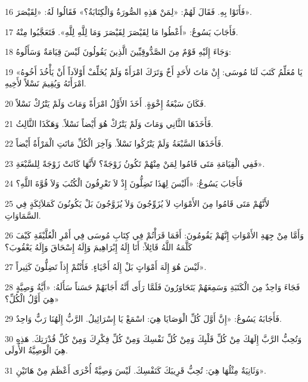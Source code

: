 \par 16 فَأَتَوْا بِهِ. فَقَالَ لَهُمْ: «لِمَنْ هَذِهِ الصُّورَةُ وَالْكِتَابَةُ؟» فَقَالُوا لَهُ: «لِقَيْصَرَ».
\par 17 فَأَجَابَ يَسُوعُ: «أَعْطُوا مَا لِقَيْصَرَ لِقَيْصَرَ وَمَا لِلَّهِ لِلَّهِ». فَتَعَجَّبُوا مِنْهُ.
\par 18 وَجَاءَ إِلَيْهِ قَوْمٌ مِنَ الصَّدُّوقِيِّينَ الَّذِينَ يَقُولُونَ لَيْسَ قِيَامَةٌ وَسَأَلُوهُ:
\par 19 «يَا مُعَلِّمُ كَتَبَ لَنَا مُوسَى: إِنْ مَاتَ لأَحَدٍ أَخٌ وَتَرَكَ امْرَأَةً وَلَمْ يُخَلِّفْ أَوْلاَداً أَنْ يَأْخُذَ أَخُوهُ امْرَأَتَهُ وَيُقِيمَ نَسْلاً لأَخِيهِ.
\par 20 فَكَانَ سَبْعَةُ إِخْوَةٍ. أَخَذَ الأَوَّلُ امْرَأَةً وَمَاتَ وَلَمْ يَتْرُكْ نَسْلاً.
\par 21 فَأَخَذَهَا الثَّانِي وَمَاتَ وَلَمْ يَتْرُكْ هُوَ أَيْضاً نَسْلاً. وَهَكَذَا الثَّالِثُ.
\par 22 فَأَخَذَهَا السَّبْعَةُ وَلَمْ يَتْرُكُوا نَسْلاً. وَآخِرَ الْكُلِّ مَاتَتِ الْمَرْأَةُ أَيْضاً.
\par 23 فَفِي الْقِيَامَةِ مَتَى قَامُوا لِمَنْ مِنْهُمْ تَكُونُ زَوْجَةً؟ لأَنَّهَا كَانَتْ زَوْجَةً لِلسَّبْعَةِ».
\par 24 فَأَجَابَ يَسُوعُ: «أَلَيْسَ لِهَذَا تَضِلُّونَ إِذْ لاَ تَعْرِفُونَ الْكُتُبَ وَلاَ قُوَّةَ اللَّهِ؟
\par 25 لأَنَّهُمْ مَتَى قَامُوا مِنَ الأَمْوَاتِ لاَ يُزَوِّجُونَ وَلاَ يُزَوَّجُونَ بَلْ يَكُونُونَ كَمَلاَئِكَةٍ فِي السَّمَاوَاتِ.
\par 26 وَأَمَّا مِنْ جِهَةِ الأَمْوَاتِ إِنَّهُمْ يَقُومُونَ: أَفَمَا قَرَأْتُمْ فِي كِتَابِ مُوسَى فِي أَمْرِ الْعُلَّيْقَةِ كَيْفَ كَلَّمَهُ اللَّهُ قَائِلاً: أَنَا إِلَهُ إِبْرَاهِيمَ وَإِلَهُ إِسْحَاقَ وَإِلَهُ يَعْقُوبَ؟
\par 27 لَيْسَ هُوَ إِلَهَ أَمْوَاتٍ بَلْ إِلَهُ أَحْيَاءٍ. فَأَنْتُمْ إِذاً تَضِلُّونَ كَثِيراً».
\par 28 فَجَاءَ وَاحِدٌ مِنَ الْكَتَبَةِ وَسَمِعَهُمْ يَتَحَاوَرُونَ فَلَمَّا رَأَى أَنَّهُ أَجَابَهُمْ حَسَناً سَأَلَهُ: «أَيَّةُ وَصِيَّةٍ هِيَ أَوَّلُ الْكُلِّ؟»
\par 29 فَأَجَابَهُ يَسُوعُ: «إِنَّ أَوَّلَ كُلِّ الْوَصَايَا هِيَ: اسْمَعْ يَا إِسْرَائِيلُ. الرَّبُّ إِلَهُنَا رَبٌّ وَاحِدٌ.
\par 30 وَتُحِبُّ الرَّبَّ إِلَهَكَ مِنْ كُلِّ قَلْبِكَ وَمِنْ كُلِّ نَفْسِكَ وَمِنْ كُلِّ فِكْرِكَ وَمِنْ كُلِّ قُدْرَتِكَ. هَذِهِ هِيَ الْوَصِيَّةُ الأُولَى.
\par 31 وَثَانِيَةٌ مِثْلُهَا هِيَ: تُحِبُّ قَرِيبَكَ كَنَفْسِكَ. لَيْسَ وَصِيَّةٌ أُخْرَى أَعْظَمَ مِنْ هَاتَيْنِ».
